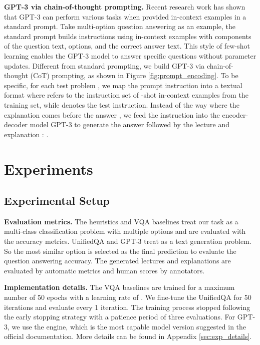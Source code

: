 \textbf{GPT-3 via chain-of-thought prompting.} Recent research work \cite{chen2020big,mishra2022lila,lu2022dynamic} has shown that GPT-3 \cite{chen2020big} can perform various tasks when provided in-context examples in a standard prompt. Take multi-option question answering as an example, the standard prompt \cite{lu2021fantastically,zhao2021calibrate,liu2021makes} builds instructions using in-context examples with components of the question text, options, and the correct answer text. This style of few-shot learning enables the GPT-3 model to answer specific questions without parameter updates. Different from standard prompting, we build GPT-3 via chain-of-thought (CoT) prompting, as shown in Figure \ref{fig:prompt_encoding}. To be specific, for each test problem , we map the prompt instruction  into a textual format where  refers to the instruction set of -shot in-context examples from the training set, while   denotes the test instruction. Instead of the way where the explanation comes before the answer \cite{wei2022chain}, we feed the instruction  into the encoder-decoder model GPT-3 to generate the answer  followed by the lecture  and explanation : .




\section{Experiments}
\label{sec:experiment}

\subsection{Experimental Setup}
\label{sec:exp_setup}
\textbf{Evaluation metrics.} The heuristics and VQA baselines treat our \name{} task as a multi-class classification problem with multiple options and are evaluated with the accuracy metrics. UnifiedQA and GPT-3 treat \name{} as a text generation problem. So the most similar option is selected as the final prediction to evaluate the question answering accuracy. The generated lectures and explanations are evaluated by automatic metrics \cite{papineni2002bleu,lin2004rouge,reimers-2019-sentence-bert} and human scores by annotators.

\textbf{Implementation details.} The VQA baselines are trained for a maximum number of 50 epochs with a learning rate of . We fine-tune the UnifiedQA for 50 iterations and evaluate every 1 iteration. The training process  stopped following the early stopping strategy with a patience period of three evaluations. For GPT-3, we use the  engine, which is the most capable model version suggested in the official documentation. More details can be found in Appendix \ref{sec:exp_details}.

